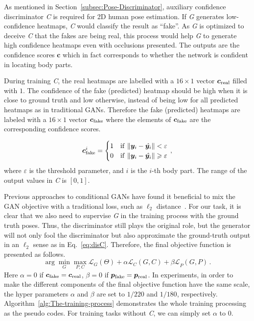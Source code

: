 \documentclass[10pt,journal,compsoc]{IEEEtran}
\begin{document}
As mentioned in Section~\ref{subsec:Pose-Discriminator}, auxiliary confidence discriminator \textit{C} is required for 2D human pose estimation.
If \textit{G} generates low-confidence heatmaps, \textit{C} would  classify the result as ``fake''.
As \textit{G} is optimized to deceive \textit{C} that the fakes are being real, this process would help \textit{G} to generate high confidence heatmaps even with occlusions presented.
The outputs are the confidence scores $\bm{c}$ which in fact corresponds to whether the network is confident in locating body parts.

During training \textit{C}, the real heatmaps are labelled with  a $16\times 1$ vector $\bm{c}_{\rm real}$ filled with $1$. The confidence of the fake (predicted) heatmap should be high when it is close to ground truth and low otherwise, instead of being low for all predicted heatmaps as in traditional GANs.
Therefore the fake (predicted) heatmaps are labeled with a   $16\times 1$ vector $\bm{c}_{\rm fake}$ where the elements of $\bm{c}_{\rm fake}$ are the corresponding confidence scores.

%
\begin{equation}
\nonumber
\bm{c}_{\rm fake}^{i}=\begin{cases}
1 & {\rm if}\thinspace\left\Vert \bm{y}_{i}-\hat{\bm{y}_{i}}\right\Vert <\varepsilon\\
0 & {\rm if}\thinspace\left\Vert \bm{y}_{i}-\hat{\bm{y}_{i}}\right\Vert \geqslant\varepsilon
\end{cases}\,,
\end{equation}
where $\varepsilon$ is the threshold parameter, and $i$ is the $i$-th body part. The range of the output values in \textit{C} is $\left[0,1\right]$.




 Previous approaches to conditional GANs have found it beneficial to mix the GAN objective with a  traditional loss, such as $\ell_2$ distance~\cite{conf/cvpr/PathakKDDE16}. For our task, it is clear  that we also need to supervise \textit{G} in the training process with the ground truth poses. Thus, the discriminator still plays the original role, but the generator will not only fool the discriminator but also approximate the ground-truth output in an $\ell_2$ sense as in Eq.~\eqref{eq:disC}. Therefore, the final objective function is presented as follows.
\begin{equation}
\label{eq:final}
\arg \min_G \max_{P,C}  \mathcal{L}_{G}(\Theta)+\mathcal{\alpha L}_{C}(G,C)+\mathcal{\beta L}_{P}(G,P) \,.
\end{equation}
Here $\alpha=0$ \rm{if} $\bm{c}_{\rm fake}=\bm{c}_{\rm real}$, $\beta=0$ \rm{if} $\bm{p}_{\rm fake}=\bm{p}_{\rm real}$.
In experiments, in order to make the different components of the final objective function have the same scale, the hyper parameters $\alpha$ and $\beta$ are set to $1/220$ and $1/180$, respectively.
Algorithm~\ref{alg:The-training-process} demonstrates the whole training processing as the pseudo codes.
For training tasks without \textit{C}, we can simply set $\alpha$ to $0$.
\end{document}

